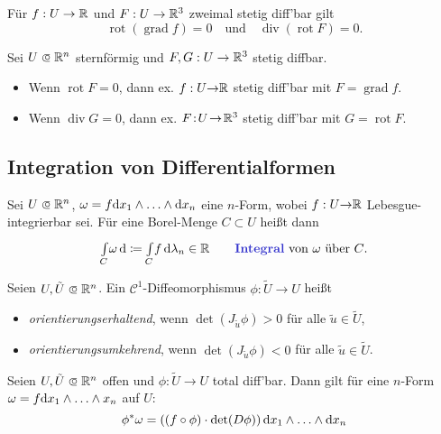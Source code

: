 \documentclass{cheat-sheet}
\DeclareMathOperator{\grad}{grad} %
\DeclareMathOperator{\divergence}{div} %
\DeclareMathOperator{\rot}{rot} %
\newcommand{\Cont}{\mathcal{C}} %
\theoremstyle{definition}
\begin{document}
\begin{lem}
  Für $f : U \to \mathbb{R}$ und $F : U \to \mathbb{R}^3$ zweimal stetig diff'bar gilt
  \[
    \rot (\grad f) = 0
    \quad \text{und} \quad
    \divergence(\rot F) = 0.
  \]
\end{lem}

\begin{samepage}

\begin{lem}
  Sei $U \opn \R^n$ sternförmig und $F, G : U \to \mathbb{R}^3$ stetig diffbar.
  \begin{itemize}
    \item Wenn $\rot F = 0$, dann ex. $f : U {\to} \mathbb{R}$ stetig diff'bar mit $F = \grad f$.
    \item Wenn $\divergence G = 0$, dann ex. $F \!:\! U \!\to\! \mathbb{R}^3$ stetig diff'bar mit $G \!=\! \rot F$.
  \end{itemize}
\end{lem}

\subsection{Integration von Differentialformen}

\end{samepage}

\begin{defn}
  Sei $U \opn \R^n$, $\omega = f \mathrm{d} x_1 \wedge \ldots \wedge \mathrm{d} x_n$ eine $n$-Form, wobei $f : U {\to} \mathbb{R}$ Lebesgue-integrierbar sei. Für eine Borel-Menge $C \subset U$ heißt dann
  \[
    \Int{C}{}{\omega}{} \coloneqq \Int{C}{}{f}{\lambda_n} \in \R
    \qquad \text{\emph{Integral} von $\omega$ über $C$.}
  \]
\end{defn}

\begin{defn}
  Seien $U, \tilde{U} \opn \R^n$. Ein $\Cont^1$-Diffeomorphismus $\phi : \tilde{U} \to U$ heißt
  \begin{itemize}
    \item \emph{orientierungserhaltend}, wenn $\det (J_{\tilde{u}} \phi) > 0$ für alle $\tilde{u} \in \tilde{U}$,
    \item \emph{orientierungsumkehrend}, wenn $\det (J_{\tilde{u}} \phi) < 0$ für alle $\tilde{u} \in \tilde{U}$.
  \end{itemize}
\end{defn}

\begin{lem}
  Seien $U, \tilde{U} \opn \R^n$ offen und $\phi : \widetilde{U} \to U$ total diff'bar. Dann gilt für eine $n$-Form $\omega = f \mathrm{d} x_1 \wedge \ldots \wedge x_n$ auf $U$:
  \[ \phi^* \omega = ((f \circ \phi) \cdot \det(D\phi)) \, \mathrm{d} x_1 \wedge \ldots \wedge \mathrm{d} x_n \]
\end{lem}
\end{document}
